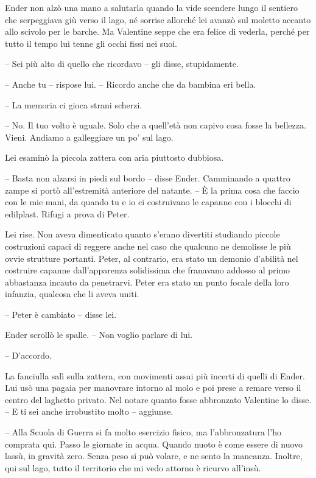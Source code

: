 {Ender non alzò una mano a salutarla quando la vide scendere lungo il
	sentiero che serpeggiava giù verso il lago, né sorrise allorché lei
	avanzò sul moletto accanto allo scivolo per le barche. Ma Valentine
	seppe che era felice di vederla, perché per tutto il tempo lui tenne gli
	occhi fissi nei suoi.}

{-- Sei più alto di quello che ricordavo -- gli disse, stupidamente.}

{-- Anche tu -- rispose lui. -- Ricordo anche che da bambina eri bella.}

{-- La memoria ci gioca strani scherzi.}

{-- No. Il tuo volto è uguale. Solo che a quell'età non capivo cosa
	fosse la bellezza. Vieni. Andiamo a galleggiare un po' sul lago.}

{Lei esaminò la piccola zattera con aria piuttosto dubbiosa.}

{-- Basta non alzarsi in piedi sul bordo -- disse Ender. Camminando a
	quattro zampe si portò all'estremità anteriore del natante. -- È la
	prima cosa che faccio con le mie mani, da quando tu e io ci costruivano
	le capanne con i blocchi di edilplast. Rifugi a prova di Peter.}

{Lei rise. Non aveva dimenticato quanto s'erano divertiti studiando
	piccole costruzioni capaci di reggere anche nel caso che qualcuno ne
	demolisse le più ovvie strutture portanti. Peter, al contrario, era
	stato un demonio d'abilità nel costruire capanne dall'apparenza
	solidissima che franavano addosso al primo abbastanza incauto da
	penetrarvi. Peter era stato un punto focale della loro infanzia,
	qualcosa che li aveva uniti.}

{-- Peter è cambiato -- disse lei.}

{Ender scrollò le spalle. -- Non voglio parlare di lui.}

{-- D'accordo.}

{La fanciulla salì sulla zattera, con movimenti assai più incerti di
	quelli di Ender. Lui usò una pagaia per manovrare intorno al molo e poi
	prese a remare verso il centro del laghetto privato. Nel notare quanto
	fosse abbronzato Valentine lo disse. -- E ti sei anche irrobustito molto
	-- aggiunse.}

{-- Alla Scuola di Guerra si fa molto esercizio fisico, ma
	l'abbronzatura l'ho comprata qui. Passo le giornate in acqua. Quando
	nuoto è come essere di nuovo lassù, in gravità zero. Senza peso si può
	volare, e ne sento la mancanza. Inoltre, qui sul lago, tutto il
	territorio che mi vedo attorno è ricurvo all'insù.}

